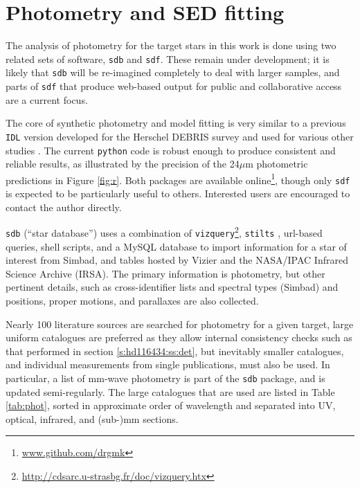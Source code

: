 \documentclass[a4paper,fleqn,usenatbib]{mnras}
\begin{document}


\appendix

\section{Photometry and SED fitting}

The analysis of photometry for the target stars in this work is done
using two related sets of software, \texttt{sdb} and \texttt{sdf}. These
remain under development; it is likely that \texttt{sdb} will be
re-imagined completely to deal with larger samples, and parts of
\texttt{sdf} that produce web-based output for public and collaborative
access are a current focus.

The core of synthetic photometry and model fitting is very similar to a
previous \texttt{IDL} version developed for the Herschel DEBRIS survey
\citep[e.g.][]{2014MNRAS.445.2558T} and used for various other studies
\citep[e.g.][]{2012MNRAS.426...91K,2014MNRAS.444.3164K}. The current
\texttt{python} code is robust enough to produce consistent and reliable
results, as illustrated by the precision of the 24$\mu$m photometric
predictions in Figure \ref{fig:r}. Both packages are available
online\footnote{\href{www.github.com/drmk}{www.github.com/drgmk}},
though only \texttt{sdf} is expected to be particularly useful to
others. Interested users are encouraged to contact the author directly.

\texttt{sdb} (``star database'') uses a combination of
\texttt{vizquery}\footnote{\href{http://cdsarc.u-strasbg.fr/doc/vizquery.htx}{http://cdsarc.u-strasbg.fr/doc/vizquery.htx}},
\texttt{stilts} \citep{2006ASPC..351..666T}, url-based queries, shell
scripts, and a MySQL database to import information for a star of
interest from Simbad, and tables hosted by Vizier and the NASA/IPAC
Infrared Science Archive (IRSA). The primary information is photometry,
but other pertinent details, such as cross-identifier lists and spectral
types (Simbad) and positions, proper motions, and parallaxes
\citep{2007A&A...474..653V,2016A&A...595A...4L} are also collected.

Nearly 100 literature sources are searched for photometry for a given
target, large uniform catalogues are preferred as they allow internal
consistency checks such as that performed in section
\ref{s:hd116434:ss:det}, but inevitably smaller catalogues, and
individual measurements from single publications, must also be used. In
particular, a list of mm-wave photometry is part of the \texttt{sdb}
package, and is updated semi-regularly. The large catalogues that are
used are listed in Table \ref{tab:phot}, sorted in approximate order of
wavelength and separated into UV, optical, infrared, and (sub-)mm
sections.
\end{document}
